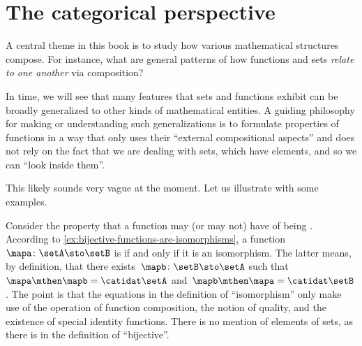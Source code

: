 \section{The categorical perspective}
\label{sec:categorical perspective}


A central theme in this book is to study how various mathematical structures compose.
For instance, what are general patterns of how functions and sets \emph{relate to one another} via composition?

In time, we will see that many features that sets and functions exhibit can be broadly generalized to other kinds of mathematical entities.
A guiding philosophy for making or understanding such generalizations is to formulate properties of functions in a way that only uses their ``external compositional aspects'' and does not rely on the fact that we are dealing with sets, which have elements, and so we can ``look inside them''.

This likely sounds very vague at the moment.
Let us illustrate with some examples.

\begin{example}
    Consider the property that a function may (or may not) have of being .
    According to \cref{ex:bijective-functions-are-isomorphisms}, a function~$\mapa\colon \setA \sto \setB$ is  if and only if it is an isomorphism.
    The latter means, by definition, that there exists~$\mapb \colon \setB \sto \setA$ such that~$\mapa \mthen \mapb = \catidat\setA$ and~$\mapb \mthen \mapa = \catidat\setB$.
    The point is that the equations in the definition of ``isomorphism'' only make use of the operation of function composition, the notion of quality, and the existence of special identity functions.
    There is no mention of elements of sets, as there is in the definition of ``bijective''.
\end{example}

